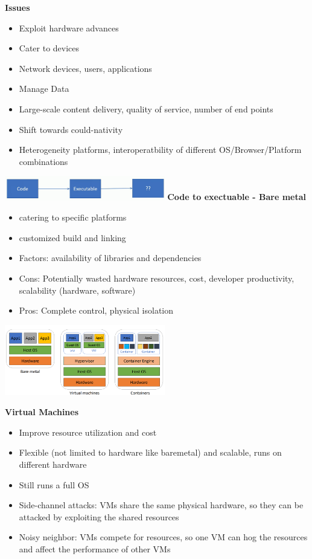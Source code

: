 \documentclass[10pt, landscape]{article}
\begin{document}
\begin{multicols}{4}
\textbf{Issues}
\begin{itemize}
  \item Exploit hardware advances 
  \item Cater to devices
  \item Network devices, users, applications
  \item Manage Data
  \item Large-scale content delivery, quality of service, number of end points 
  \item Shift towards could-nativity 
  \item Heterogeneity platforms, interoperatbility of different OS/Browser/Platform combinations
\end{itemize}

\includegraphics*[width=7cm]{deployment_mechanism}
\textbf{Code to exectuable - Bare metal}
\begin{itemize}
    \item catering to specific platforms
    \item customized build and linking 
    \item Factors: availability of libraries and dependencies 
    \item Cons: Potentially wasted hardware resources, cost, developer productivity, scalability (hardware, software)
    \item Pros: Complete control, physical isolation
\end{itemize}

\includegraphics*[width=7cm]{deployment_models}

\textbf{Virtual Machines}
\begin{itemize}
    \item Improve resource utilization and cost
    \item Flexible (not limited to hardware like baremetal) and scalable, runs on different hardware
    \item Still runs a full OS 
    \item Side-channel attacks: VMs share the same physical hardware, so they can be attacked by exploiting the shared resources
    \item Noisy neighbor: VMs compete for resources, so one VM can hog the resources and affect the performance of other VMs
\end{itemize}


\end{multicols}
\end{document}
